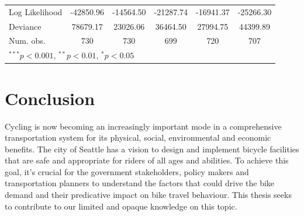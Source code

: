 \documentclass [11pt, proquest] {uwthesis}[2015/03/03]
\begin{document}
\begin{table}
\begin{center}
\begin{tabular}{l c c c c c }
Log Likelihood & -42850.96     & -14564.50     & -21287.74     & -16941.37     & -25266.30     \\
Deviance       & 78679.17      & 23026.06      & 36464.50      & 27994.75      & 44399.89      \\
Num. obs.      & 730           & 730           & 699           & 720           & 707           \\
\hline
\multicolumn{6}{l}{\scriptsize{$^{***}p<0.001$, $^{**}p<0.01$, $^*p<0.05$}}
\end{tabular}
\label{table:coefficients}
\end{center}
\end{table}



\chapter{Conclusion}

Cycling is now becoming an increasingly important mode in a comprehensive transportation system for its physical, social, environmental and economic benefits. The city of Seattle has a vision to design and implement bicycle facilities that are safe and appropriate for riders of all ages and abilities. To achieve this goal, it's crucial for the government stakeholders, policy makers and transportation planners to understand the factors that could drive the bike demand and their predicative impact on bike travel behaviour. This thesis seeks to contribute to our limited and opaque knowledge on this topic.
\end{document}
